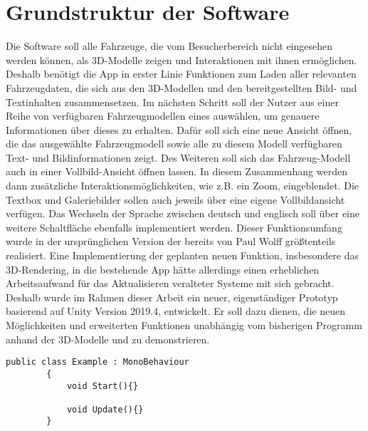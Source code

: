 	\section{Grundstruktur der Software}
	\label{sec:struct}
	Die Software soll alle Fahrzeuge, die vom Besucherbereich nicht eingesehen werden können, als 3D-Modelle zeigen und Interaktionen mit ihnen ermöglichen. Deshalb benötigt die App in erster Linie Funktionen zum Laden aller relevanten Fahrzeugdaten, die sich aus den 3D-Modellen und den bereitgestellten Bild- und Textinhalten zusammensetzen. Im nächsten Schritt soll der Nutzer aus einer Reihe von verfügbaren Fahrzeugmodellen eines auswählen, um genauere Informationen über dieses zu erhalten. Dafür soll sich eine neue Ansicht öffnen, die das ausgewählte Fahrzeugmodell sowie alle zu diesem Modell verfügbaren Text- und Bildinformationen zeigt. Des Weiteren soll sich das Fahrzeug-Modell auch in einer Vollbild-Ansicht öffnen lassen. In diesem Zusammenhang werden dann zusätzliche Interaktionsmöglichkeiten, wie z.B. ein Zoom, eingeblendet. Die Textbox und Galeriebilder sollen auch jeweils über eine eigene Vollbildansicht verfügen. Das Wechseln der Sprache zwischen deutsch und englisch soll über eine weitere Schaltfläche ebenfalls implementiert werden. Dieser Funktionsumfang wurde in der ursprünglichen Version der \mapp bereits von Paul Wolff größtenteils realisiert. Eine Implementierung der geplanten neuen Funktion, insbesondere das 3D-Rendering, in die bestehende App hätte allerdings einen erheblichen Arbeitsaufwand für das Aktualisieren veralteter Systeme mit sich gebracht. Deshalb wurde im Rahmen dieser Arbeit ein neuer, eigenständiger Prototyp basierend auf Unity Version 2019.4, entwickelt. Er soll dazu dienen, die neuen Möglichkeiten und erweiterten Funktionen unabhängig vom bisherigen Programm anhand der 3D-Modelle  und  zu demonstrieren. 
	\begin{lstlisting}[language={[Sharp]C}, caption={Die Grundstruktur einer durch Unity erstellten C\#-Klasse.}, label={lst:defaultscript}, float]
		public class Example : MonoBehaviour
		{
			void Start(){}
			
			void Update(){}
		}
	\end{lstlisting}
%